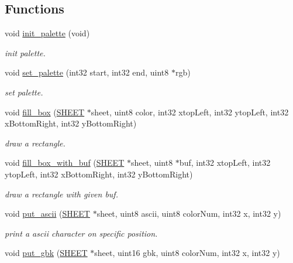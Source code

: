 \subsection*{Functions}
\begin{DoxyCompactItemize}
\item 
void \hyperlink{group__graphic_ga42a564ae1340c89e85f7ef58c6f8e46e}{init\+\_\+palette} (void)
\begin{DoxyCompactList}\small\item\em init palette. \end{DoxyCompactList}\item 
void \hyperlink{group__graphic_gaa03047a07f0e57f8490f995f95f887a4}{set\+\_\+palette} (int32 start, int32 end, uint8 $\ast$rgb)
\begin{DoxyCompactList}\small\item\em set palette. \end{DoxyCompactList}\item 
void \hyperlink{group__graphic_ga15a51b4145d9fed0bc2383d42048c505}{fill\+\_\+box} (\hyperlink{struct_s_h_e_e_t}{S\+H\+E\+E\+T} $\ast$sheet, uint8 color, int32 xtop\+Left, int32 ytop\+Left, int32 x\+Bottom\+Right, int32 y\+Bottom\+Right)
\begin{DoxyCompactList}\small\item\em draw a rectangle. \end{DoxyCompactList}\item 
void \hyperlink{group__graphic_gad6234cf55f926d30484f7eed8fab1c5e}{fill\+\_\+box\+\_\+with\+\_\+buf} (\hyperlink{struct_s_h_e_e_t}{S\+H\+E\+E\+T} $\ast$sheet, uint8 $\ast$buf, int32 xtop\+Left, int32 ytop\+Left, int32 x\+Bottom\+Right, int32 y\+Bottom\+Right)
\begin{DoxyCompactList}\small\item\em draw a rectangle with given buf. \end{DoxyCompactList}\item 
void \hyperlink{group__graphic_ga3473d9d6db4f8034f42fb16294638269}{put\+\_\+ascii} (\hyperlink{struct_s_h_e_e_t}{S\+H\+E\+E\+T} $\ast$sheet, uint8 ascii, uint8 color\+Num, int32 x, int32 y)
\begin{DoxyCompactList}\small\item\em print a ascii character on specific position. \end{DoxyCompactList}\item 
void \hyperlink{group__graphic_ga63709ef370e647226f826b80d0f65130}{put\+\_\+gbk} (\hyperlink{struct_s_h_e_e_t}{S\+H\+E\+E\+T} $\ast$sheet, uint16 gbk, uint8 color\+Num, int32 x, int32 y)

\end{DoxyCompactItemize}
